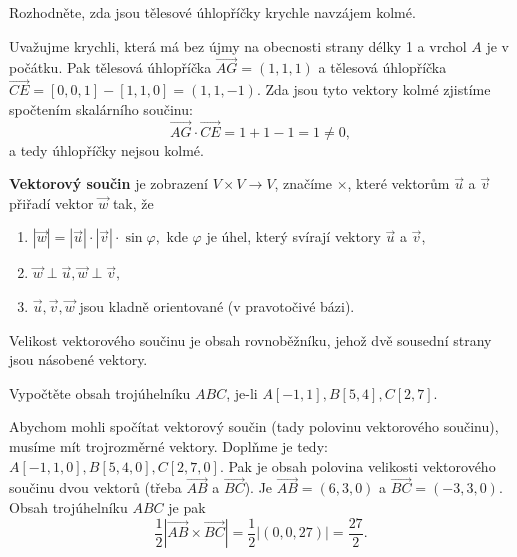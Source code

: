 \begin{priklad}
Rozhodněte, zda jsou tělesové úhlopříčky krychle navzájem kolmé.
\end{priklad}

\begin{reseni}
Uvažujme krychli, která má bez újmy na obecnosti strany délky 1 a vrchol $A$ je v počátku. Pak
tělesová úhlopříčka $\overrightarrow{AG} = (1,1,1)$ a tělesová úhlopříčka $\overrightarrow{CE} = [0,0,1]-[1,1,0]=(1,1,-1)$.
Zda jsou tyto vektory kolmé zjistíme spočtením skalárního součinu:
$$
    \overrightarrow{AG} \cdot \overrightarrow{CE} = 1 + 1 -1 = 1 \ne 0,
$$
a tedy úhlopříčky nejsou kolmé.
\end{reseni}

\begin{definition}
\textbf{Vektorový součin} je zobrazení $V\times V\to  V$, značíme $\times$, které vektorům $\vec u$ a $\vec v$ přiřadí vektor $\vec w$ tak, že
\begin{enumerate}[$i.$]
\item $|\vec w| = |\vec u|\cdot |\vec v|\cdot \sin \varphi,$ kde $\varphi$ je úhel, který svírají vektory $\vec u$ a $\vec v$,
\item $\vec w\perp \vec u, \vec w \perp \vec v,$
\item $\vec u, \vec v, \vec w$ jsou kladně orientované (v pravotočivé bázi).
\end{enumerate}
\end{definition}

\begin{pozn}
    Velikost vektorového součinu je obsah rovnoběžníku, jehož dvě sousední strany jsou
    násobené vektory.
\end{pozn}

\begin{priklad}
Vypočtěte obsah trojúhelníku $ABC$, je-li $A[-1,1], B[5,4], C[2,7].$
\end{priklad}

\begin{reseni}
Abychom mohli spočítat vektorový součin (tady polovinu vektorového součinu), musíme
mít trojrozměrné vektory. Doplňme je tedy: $A[-1,1, 0], B[5,4, 0], C[2,7,0].$ Pak
je obsah polovina velikosti vektorového součinu dvou vektorů (třeba $\overrightarrow{AB}$ a $\overrightarrow{BC}$).
Je $\overrightarrow{AB} = (6,3,0)$ a $\overrightarrow{BC} = (-3,3,0)$. Obsah trojúhelníku $ABC$ je pak
$$
\frac{1}{2} \left | \overrightarrow{AB} \times \overrightarrow{BC}\right | = \frac{1}{2} \left | (0,0,27) \right | = \frac{27}{2}.
$$
\end{reseni}

